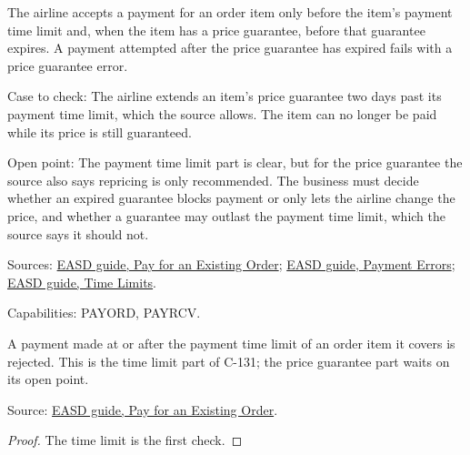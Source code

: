 \begin{theorem}
  \label{thm:payment-no-late-payment}
  \notready
  The airline accepts a payment for an order item only before the item's
  payment time limit and, when the item has a price guarantee, before that
  guarantee expires. A payment attempted after the price guarantee has
  expired fails with a price guarantee error.

  Case to check: The airline extends an item's price guarantee two days past
  its payment time limit, which the source allows. The item can no longer be
  paid while its price is still guaranteed.

  Open point: The payment time limit part is clear, but for the price
  guarantee the source also says repricing is only recommended. The business
  must decide whether an expired guarantee blocks payment or only lets the
  airline change the price, and whether a guarantee may outlast the payment
  time limit, which the source says it should not.

  Sources: \href{https://standards.atlassian.net/wiki/spaces/EASD/pages/574226556/Pay+for+an+Existing+Order}{EASD guide, Pay for an Existing Order};
  \href{https://standards.atlassian.net/wiki/spaces/EASD/pages/574587020/Payment+Errors}{EASD guide, Payment Errors};
  \href{https://standards.atlassian.net/wiki/spaces/EASD/pages/574423066/Time+Limits}{EASD guide, Time Limits}.

  Capabilities: PAYORD, PAYRCV.
\end{theorem}

\begin{theorem}
  \label{thm:payment-accept-time-limit}
  A payment made at or after the payment time limit of an order item it
  covers is rejected.  This is the time limit part of C-131; the price
  guarantee part waits on its open point.

  Source: \href{https://standards.atlassian.net/wiki/spaces/EASD/pages/574226556/Pay+for+an+Existing+Order}{EASD guide, Pay for an Existing Order}.
\end{theorem}
\begin{proof}
  The time limit is the first check.
\end{proof}

